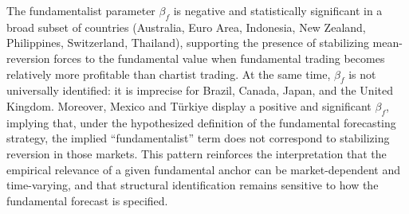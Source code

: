 \documentclass[a4paper,10pt,final]{article}    %
\begin{document}
The fundamentalist parameter $\beta_f$ is negative and statistically significant in a broad subset of countries (Australia, Euro Area, Indonesia, New Zealand, Philippines, Switzerland, Thailand), supporting the presence of stabilizing mean-reversion forces to the fundamental value when fundamental trading becomes relatively more profitable than chartist trading. At the same time, $\beta_f$ is not universally identified: it is imprecise for Brazil, Canada, Japan, and the United Kingdom. Moreover, Mexico and Türkiye display a positive and significant $\beta_f$, implying that, under the hypothesized definition of the fundamental forecasting strategy, the implied ``fundamentalist'' term does not correspond to stabilizing reversion in those markets. This pattern reinforces the interpretation that the empirical relevance of a given fundamental anchor can be market-dependent and time-varying, and that structural identification remains sensitive to how the fundamental forecast is specified.
\end{document}
